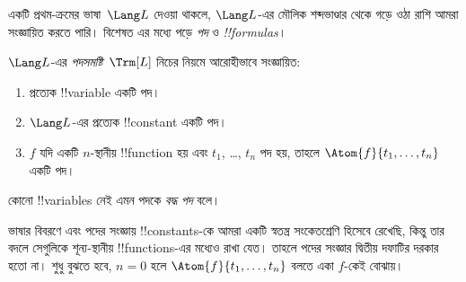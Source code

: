 \documentclass[../../../include/open-logic-section]{subfiles}
\begin{document}


একটি প্রথম-ক্রমের ভাষা~$\Lang L$ দেওয়া থাকলে, $\Lang L$-এর মৌলিক
শব্দভাণ্ডার থেকে গড়ে ওঠা রাশি আমরা সংজ্ঞায়িত করতে পারি। বিশেষত এর
মধ্যে পড়ে \emph{পদ} ও \emph{!!{formula}s}।

\begin{defn}[পদ]
$\Lang L$-এর \emph{পদসমষ্টি}~$\Trm[L]$ নিচের নিয়মে আরোহীভাবে
সংজ্ঞায়িত:
\begin{enumerate}
\item প্রত্যেক !!{variable} একটি পদ।
\item $\Lang L$-এর প্রত্যেক !!{constant} একটি পদ।
\item $f$ যদি একটি $n$-স্থানীয় !!{function} হয় এবং $t_1$, \dots,
  $t_n$ পদ হয়, তাহলে $\Atom{f}{t_1, \ldots, t_n}$ একটি পদ।
\end{enumerate}
কোনো !!{variable}s নেই এমন পদকে \emph{বদ্ধ পদ} বলে।
\end{defn}

\begin{explain}
ভাষার বিবরণে এবং পদের সংজ্ঞায় !!{constant}s-কে আমরা একটি স্বতন্ত্র
সংকেতশ্রেণি হিসেবে রেখেছি, কিন্তু তার বদলে সেগুলিকে শূন্য-স্থানীয়
!!{function}s-এর মধ্যেও রাখা যেত। তাহলে পদের সংজ্ঞার দ্বিতীয় দফাটির
দরকার হতো না। শুধু বুঝতে হবে, $n = 0$ হলে
$\Atom{f}{t_1, \ldots, t_n}$ বলতে একা $f$-কেই বোঝায়।
\end{explain}
\end{document}
